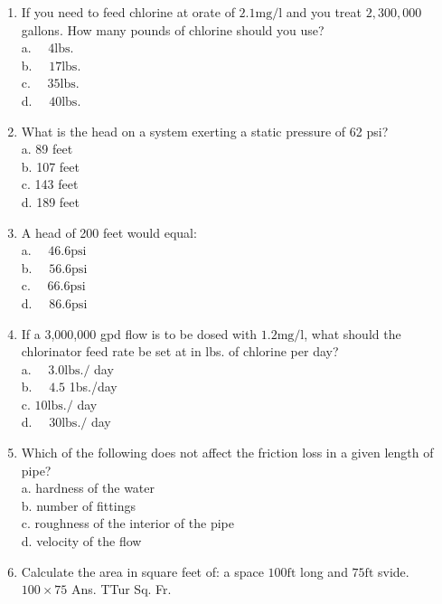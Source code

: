 \documentclass{article}
\begin{document}
\begin{enumerate}
\item If you need to feed chlorine at orate of $2.1 \mathrm{mg} / \mathrm{l}$ and you treat $2,300,000$ gallons. How many pounds of chlorine should you use?\\
a. $\quad 4 \mathrm{lbs}$.\\
b. $\quad 17 \mathrm{lbs}$.\\
c. $\quad 35 \mathrm{lbs}$.\\
d. $\quad 40 \mathrm{lbs}$.\\

\item What is the head on a system exerting a static pressure of 62 psi?\\
a. 89 feet\\
b. 107 feet\\
c. 143 feet\\
d. 189 feet \\


\item A head of 200 feet would equal:\\
a. $\quad 46.6 \mathrm{psi}$\\
b. $\quad 56.6 \mathrm{psi}$\\
c. $\quad 66.6 \mathrm{psi}$\\
d. $\quad 86.6 \mathrm{psi}$\\


\item If a 3,000,000 gpd flow is to be dosed with $1.2 \mathrm{mg} / \mathrm{l}$, what should the chlorinator feed rate be set at in lbs. of chlorine per day?\\
a. $\quad 3.0 \mathrm{lbs} . /$ day\\
b. $\quad 4.5$ 1bs./day\\
c. $10 \mathrm{lbs} . /$ day\\
d. $\quad 30 \mathrm{lbs} . /$ day\\

\item Which of the following does not affect the friction loss in a given length of pipe?\\
a. hardness of the water\\
b. number of fittings\\
c. roughness of the interior of the pipe\\
d. velocity of the flow\\

\item Calculate the area in square feet of: a space $100 \mathrm{ft}$ long and $75 \mathrm{ft}$ svide. $100 \times 75$ Ans. TTur Sq. Fr.\\


\end{enumerate}
\end{document}

